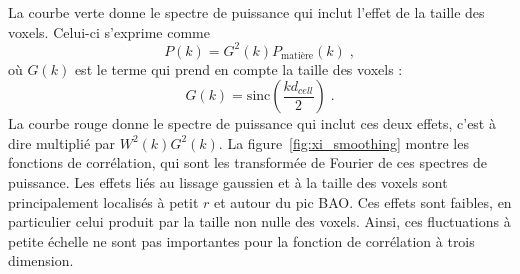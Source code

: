   La courbe verte donne le spectre de puissance qui inclut l'effet de la taille des voxels. Celui-ci s'exprime comme
  \begin{equation}
    P(k) =   G^2(k) P_{\mathrm{matière}}(k) \; ,
  \end{equation}
  où $G(k)$ est le terme qui prend en compte la taille des voxels :
  \begin{equation}
    \label{eq:effet_reso}
    G(k) = \mathrm{sinc}\left(\frac{k d_{cell}}{2}\right)  \; .
  \end{equation}
  La courbe rouge donne le spectre de puissance qui inclut ces deux effets, c'est à dire multiplié par $W^2(k)G^2(k)$.
  La figure~\ref{fig:xi_smoothing} montre les fonctions de corrélation, qui sont les transformée de Fourier de ces spectres de puissance.
  Les effets liés au lissage gaussien et à la taille des voxels sont principalement localisés à petit $r$ et autour du pic BAO. Ces effets sont faibles, en particulier celui produit par la taille non nulle des voxels.
  Ainsi, ces fluctuations à petite échelle ne sont pas importantes pour la fonction de corrélation à trois dimension.

